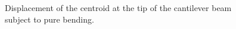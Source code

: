 \documentclass{AeroStructure-ERJohnson}
\begin{document}
{\def\thefigure{4.21}
\begin{figure}
\caption{Displacement of the centroid at the tip of the cantilever beam subject to pure bending.\label{fig4.21}} \end{figure}
}
\end{document}
